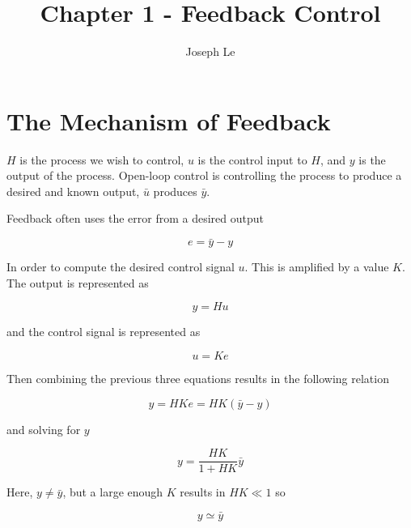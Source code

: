 \documentclass[10pt]{article}
\begin{document}

\title{Chapter 1 - Feedback Control}
\author{Joseph Le}

\maketitle

\section{The Mechanism of Feedback}

$H$ is the process we wish to control, $u$ is the control input to $H$, and $y$ is the output of the  process. Open-loop control is controlling the process to produce a desired and known output, $\bar u$ produces $\bar y$.

Feedback often uses the error from a desired output

\begin{equation}
    \label{outputerror}
    e = \bar{y} - y
\end{equation}

In order to compute the desired control signal $u$. This is amplified by a value $K$. The output is represented as

\begin{equation}
    \label{output}
    y = H u
\end{equation}

and the control signal is represented as

\begin{equation}
    u = K e
\end{equation}

Then combining the previous three equations results in the following relation

$$ y = HKe = HK(\bar y - y) $$

\noindent and solving for $y$

\begin{equation}
    y = \frac{HK}{1 + HK}\bar y
\end{equation}

Here, $y \neq \bar y$, but a large enough $K$ results in $HK \ll 1$ so

\begin{equation}
    y \simeq \bar y
\end{equation}
\end{document}

